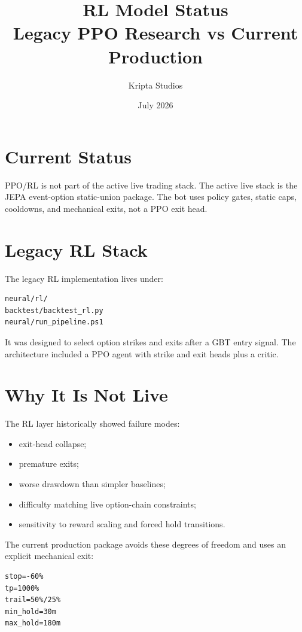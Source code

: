 \documentclass[11pt,a4paper]{article}
\title{\textbf{RL Model Status}\\Legacy PPO Research vs Current Production}
\author{Kripta Studios}
\date{July 2026}
\begin{document}
\maketitle
\tableofcontents
\newpage

\section{Current Status}

PPO/RL is not part of the active live trading stack. The active live stack is the JEPA event-option static-union package. The bot uses policy gates, static caps, cooldowns, and mechanical exits, not a PPO exit head.

\section{Legacy RL Stack}

The legacy RL implementation lives under:

\begin{lstlisting}
neural/rl/
backtest/backtest_rl.py
neural/run_pipeline.ps1
\end{lstlisting}

It was designed to select option strikes and exits after a GBT entry signal. The architecture included a PPO agent with strike and exit heads plus a critic.

\section{Why It Is Not Live}

The RL layer historically showed failure modes:

\begin{itemize}
  \item exit-head collapse;
  \item premature exits;
  \item worse drawdown than simpler baselines;
  \item difficulty matching live option-chain constraints;
  \item sensitivity to reward scaling and forced hold transitions.
\end{itemize}

The current production package avoids these degrees of freedom and uses an explicit mechanical exit:

\begin{lstlisting}
stop=-60%
tp=1000%
trail=50%/25%
min_hold=30m
max_hold=180m
\end{lstlisting}
\end{document}
